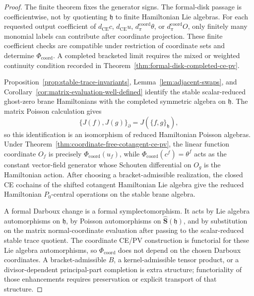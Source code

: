 \documentclass[11pt]{memoir}
\begin{document}
\begin{proof}
  The finite theorem fixes the generator signs.  The formal-disk passage
  is coefficientwise, not by quotienting \(\mathfrak h\) to finite
  Hamiltonian Lie algebras.  For each requested output coefficient of
  \(d_{\mathrm{CE}}c\), \(d_{\mathrm{CE}}u\), \(d_\pi^{\mathrm{coord}}\theta\), or
  \(d_\pi^{\mathrm{coord}}O\), only finitely many monomial labels can contribute after
  coordinate projection.  These finite coefficient checks are compatible
  under restriction of coordinate sets and determine
  \(\Phi_{\mathrm{coord}}\).  A completed bracketed limit requires the
  mixed or weighted continuity condition recorded in
  Theorem~\ref{thm:formal-disk-completed-ce-pv}.

  Proposition~\ref{prop:stable-trace-invariants}, Lemma~\ref{lem:adjacent-swaps},
  and Corollary~\ref{cor:matrix-evaluation-well-defined} identify the stable
  scalar-reduced ghost-zero brane Hamiltonians with the completed symmetric
  algebra on \(\mathfrak h\). The matrix Poisson calculation gives
  \[
    \{J(f),J(g)\}_{\partial}=J(\{f,g\}_{\mathfrak h}),
  \]
  so this identification is an isomorphism of reduced Hamiltonian Poisson
  algebras. Under Theorem~\ref{thm:coordinate-free-cotangent-ce-pv}, the
  linear function coordinate \(O_f\) is precisely
  \(\Phi_{\mathrm{coord}}(u_f)\), while
  \(\Phi_{\mathrm{coord}}(c^f)=\theta^f\) acts as the constant
  vector-field generator whose Schouten differential on \(O_g\) is the
  Hamiltonian action.  After choosing a bracket-admissible realization,
  the closed CE cochains of the shifted cotangent Hamiltonian Lie algebra
  give the reduced Hamiltonian \(P_0\)-central operations on the stable
  brane algebra.

  A formal Darboux change is a formal symplectomorphism. It acts by Lie
  algebra automorphisms on \(\mathfrak h\), by Poisson automorphisms on
  \(\widehat{\mathbf S}(\mathfrak h)\), and by substitution on the matrix
  normal-coordinate evaluation after passing to the scalar-reduced stable
  trace quotient. The coordinate CE/PV construction is functorial for
  these Lie algebra automorphisms, so \(\Phi_{\mathrm{coord}}\) does not
  depend on the chosen Darboux coordinates.  A bracket-admissible
  \(B\), a kernel-admissible tensor product, or a divisor-dependent
  principal-part completion is extra structure; functoriality of those
  enhancements requires preservation or explicit transport of that
  structure.
\end{proof}
\end{document}
